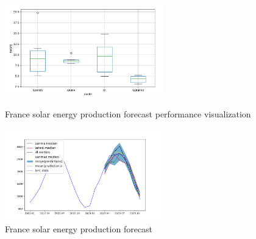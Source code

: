 \documentclass[acmtog]{acmart}
\begin{document}
\begin{figure}[htp!]
    \centering
    \begin{minipage}{0.45\textwidth}
        \centering
        \includegraphics[width=\textwidth, height=4cm]{figures/Figure_3.png}
        \caption{France solar energy production forecast performance visualization}
        \label{fig:solar_performance_forecast}
    \end{minipage}
    \hfill
    \begin{minipage}{0.45\textwidth}
        \centering
        \includegraphics[width=\textwidth, height=4cm]{figures/Figure_1.png}
        \caption{France solar energy production forecast}
        \label{fig:solar_forecast}
    \end{minipage}
\end{figure}
\end{document}
